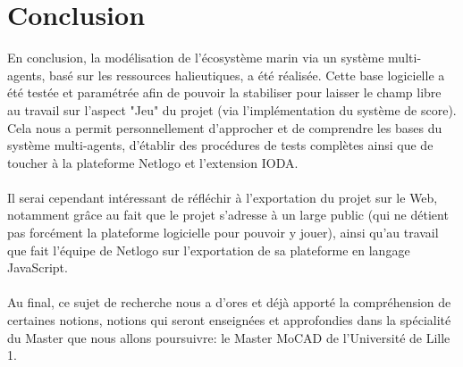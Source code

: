 \chapter*{Conclusion}

En conclusion, la modélisation de l'écosystème marin via un système multi-agents, basé sur les ressources halieutiques, a été réalisée. Cette base logicielle a été testée et paramétrée afin de pouvoir la stabiliser pour laisser le champ libre au travail sur l'aspect "Jeu" du projet (via l'implémentation du système de score).
\\
Cela nous a permit personnellement d'approcher et de comprendre les bases du système multi-agents, d'établir des procédures de tests complètes ainsi que de toucher à la plateforme Netlogo et l'extension IODA.
\\
\\
Il serai cependant intéressant de réfléchir à l'exportation du projet sur le Web, notamment grâce au fait que le projet s'adresse à un large public (qui ne détient pas forcément la plateforme logicielle pour pouvoir y jouer), ainsi qu'au travail que fait l'équipe de Netlogo sur l'exportation de sa plateforme en langage JavaScript.
\\
\\
Au final, ce sujet de recherche nous a d'ores et déjà apporté la compréhension de certaines notions, notions qui seront enseignées et approfondies dans la spécialité du Master que nous allons poursuivre: le Master MoCAD de l'Université de Lille 1.